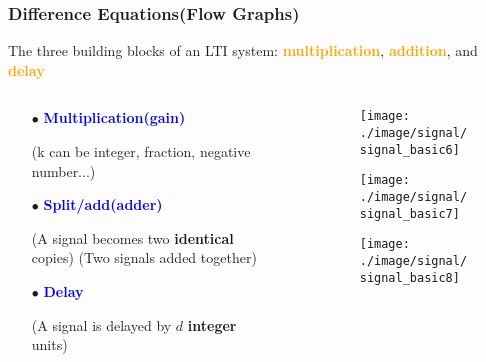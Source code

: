 \documentclass{beamer}
\newcommand{\blue}[1]{\textcolor{blue}{#1}}
\newcommand{\orange}[1]{\textcolor{orange}{#1}}
\begin{document}
\begin{frame}


\frametitle{Difference Equations(Flow Graphs)}
The three building blocks of an LTI system: \orange{\bf multiplication}, \orange{\bf addition}, and \orange{\bf delay}

\begin{columns}
\begin{column}{6 cm}
\begin{itemize} \itemsep2pt \parskip0pt 
  \item[$\bullet$] \blue{\bf Multiplication(gain)}
  \item[] (k can be integer, fraction, negative number...)
  \item[$\bullet$] \blue{\bf Split/add(adder)}
  \item[] (A signal becomes two {\bf identical} copies)\newline
          (Two signals added together)
  \item[$\bullet$] \blue{\bf Delay}
  \item[] (A signal is delayed by $d$ {\bf integer} units)
\end{itemize}
\end{column}

\begin{column}{6 cm}
\begin{itemize} \itemsep10pt \parskip0pt 
  \item[]
  \begin{figure}[H]
  \centering
  \texttt{[image: ./image/signal/signal\_basic6]}
  \end{figure}

  \item[]
  \begin{figure}[H]
  \centering
  \texttt{[image: ./image/signal/signal\_basic7]}
  \end{figure}

  \item[]
  \begin{figure}[H]
  \centering
  \texttt{[image: ./image/signal/signal\_basic8]}
  \end{figure}
\end{itemize}
\end{column}

\end{columns}



\end{frame}
\end{document}
